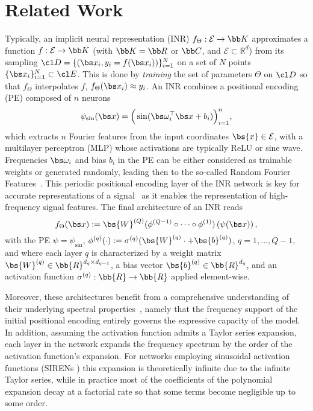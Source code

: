 \section{Related Work}
\label{sec:related_work}
Typically, an implicit neural representation (INR) $f_\Theta: \mathcal{E} \to \bb K$ approximates a function \( f : \mathcal{E} \to \bb K \) (with $\bb K = \bb R$ or $\bb C$, and \(\mathcal{E} \subset \mathbb{R}^d\)) from its sampling $\cl D = \{(\bs x_i, y_i = f(\bs x_i))\}_{i=1}^N$ on a set of $N$ points $\{\bs x_i\}_{i=1}^N \subset \cl E$. This is done by \emph{training} the set of parameters $\Theta$ on $\cl D$ so that $f_\Theta$ interpolates $f$, \ie $f_\Theta(\bs x_i) \approx y_i$. An INR combines a positional encoding (PE) composed of $n$ neurons
\begin{equation}
\label{eq:PE-Euclidean-INR}
\psi_{\sin}(\bs x) = \Big(\sin(\bs \omega_i^\top \bs x + b_i)\Big)_{i=1}^n,    
\end{equation}
which extracts $n$ Fourier features from the input coordinates \(\bs{x} \in \mathcal{E}\), with a multilayer perceptron (MLP) whose activations are typically ReLU or sine wave.  Frequencies $\bs \omega_i$ and bias $b_i$ in the PE can be either considered as trainable weights 
or generated randomly, leading then to the so-called Random Fourier Features~\cite{Rahimi2007RandomFF}.
This periodic positional encoding layer of the INR network is key for accurate representations of a signal~\cite{tancik_fourier_2020} as it enables the representation of high-frequency signal features. 
The final architecture of an INR reads
\begin{equation}
\label{eq:INR}
f_{\Theta}(\bs x) := \bs{W}^{(Q)} (\phi^{(Q-1)}\circ \cdots \circ \phi^{(1)})\left(\psi(\bs x)\right),
\end{equation}
with the PE $\psi = \psi_{\sin}$, $\phi^{(q)}(\cdot) := \sigma^{(q)} (\bs{W}^{(q)} \cdot + \bs{b}^{(q)})$, $q=1,\ldots,Q-1$, and where each layer \( q \) is characterized by a weight matrix \( \bs{W}^{(q)} \in \bb{R}^{d_{q} \times d_{q-1}} \), a bias vector \( \bs{b}^{(q)} \in \bb{R}^{d_q} \), and an activation function \( \sigma^{(q)}: \bb{R} \rightarrow \bb{R} \) applied element-wise. 

Moreover, these architectures benefit from a comprehensive understanding of their underlying spectral properties~\cite{yuce2022structureddictionaryperspectiveimplicit}, namely that the frequency support of the initial positional encoding entirely governs the expressive capacity of the model. 
In addition, assuming the activation function admits a Taylor series expansion, 
each layer in the network expands the frequency spectrum by the order of the activation function’s expansion. For networks employing sinusoidal activation functions (\eg SIRENs \cite{sitzmann2020implicitneuralrepresentationsperiodic}) this expansion is theoretically infinite due to the infinite Taylor series, while in practice most of the coefficients of the polynomial expansion decay at a factorial rate so that some terms become negligible up to some order.   


